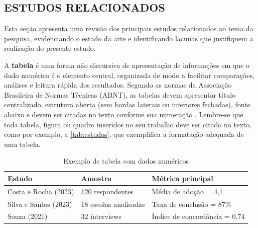 \subsection{ESTUDOS RELACIONADOS}
\label{subsec:estudos-relacionados} 

Esta seção apresenta uma revisão dos principais estudos relacionados ao tema da pesquisa, evidenciando o estado da arte e identificando lacunas que justifiquem a realização do presente estudo.

A \textbf{tabela} é uma forma não discursiva de apresentação de informações em que o dado numérico é o elemento central, organizada de modo a facilitar comparações, análises e leitura rápida dos resultados. Segundo as normas da Associação Brasileira de Normas Técnicas (ABNT), as tabelas devem apresentar título centralizado, estrutura aberta (sem bordas laterais ou inferiores fechadas), fonte abaixo e devem ser citadas no texto conforme sua numeração \cite{ABNT_NBR14724_2011,ABNT_NBR15287_2011,ABNT_NBR6024_2012}. Lembre-se que toda tabela, figura ou quadro inseridos no seu trabalho deve ser citado no texto, como por exemplo, a \autoref{tab:estudos}, que exemplifica a formatação adequada de uma tabela. 

\begin{table}[htbp] %
    \centering
    \caption{Exemplo de tabela com dados numéricos}
    \label{tab:estudos}
    \begin{tabularx}{0.8\textwidth}{p{4cm}XX} %
        \toprule
        \textbf{Estudo} & \textbf{Amostra} & \textbf{Métrica principal} \\ %
        \midrule
        Costa e Rocha (2023) & 120 respondentes & Média de adoção = 4,1 \\
        Silva e Santos (2023) & 18 escolas analisadas & Taxa de conclusão = 87\% \\
        Souza (2021) & 32 interviews & Índice de concordância = 0,74 \\
        \bottomrule
    \end{tabularx}
\end{table}



